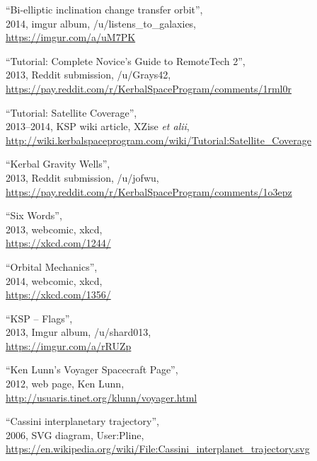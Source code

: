 \begin{thebibliography}{99}
“Bi-elliptic inclination change transfer orbit”, \\
2014, imgur album, /u/listens\_to\_galaxies, \\
\url{https://imgur.com/a/uM7PK}

“Tutorial: Complete Novice's Guide to RemoteTech 2”, \\
2013, Reddit submission, /u/Grays42, \\
\url{https://pay.reddit.com/r/KerbalSpaceProgram/comments/1rml0r}

“Tutorial: Satellite Coverage”, \\
2013--2014, KSP wiki article, XZise \emph{et alii}, \\
{\small\url{http://wiki.kerbalspaceprogram.com/wiki/Tutorial:Satellite_Coverage}}

“Kerbal Gravity Wells”, \\
2013, Reddit submission, /u/jofwu, \\
\url{https://pay.reddit.com/r/KerbalSpaceProgram/comments/1o3epz}

“Six Words”, \\
2013, webcomic, xkcd, \\
\url{https://xkcd.com/1244/}

“Orbital Mechanics”, \\
2014, webcomic, xkcd, \\
\url{https://xkcd.com/1356/}

“KSP -- Flags”, \\
2013, Imgur album, /u/shard013, \\
\url{https://imgur.com/a/rRUZp}

“Ken Lunn's Voyager Spacecraft Page”, \\
2012, web page, Ken Lunn, \\
\url{http://usuaris.tinet.org/klunn/voyager.html}

“Cassini interplanetary trajectory”, \\
2006, SVG diagram, User:Pline, \\
{\footnotesize\url{https://en.wikipedia.org/wiki/File:Cassini_interplanet_trajectory.svg}}


\end{thebibliography}

